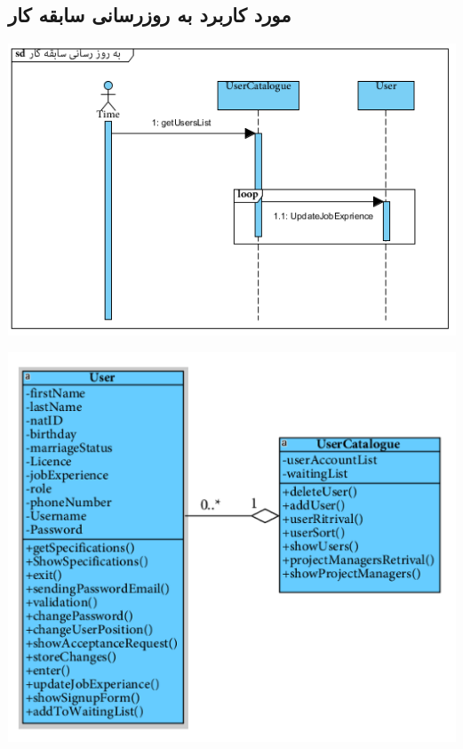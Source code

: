 \subsection*{مورد کاربرد به روزرسانی سابقه کار}
\vspace{2cm}
\begin{center}
\includegraphics[width=\textwidth]{SequenceDiagrams/9.png}
\end{center}

\newpage
\vspace{2cm}
\begin{center}
\includegraphics[width=\textwidth]{SequenceClasses/9.png}
\end{center}

